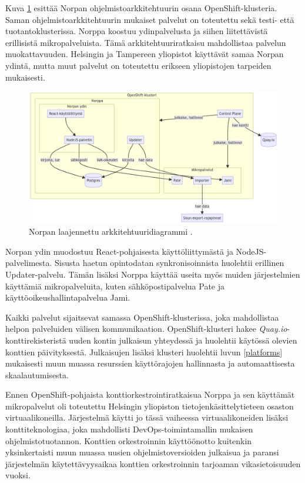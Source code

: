 Kuva \ref{fig:norppa:architecture} esittää Norpan ohjelmistoarkkitehtuurin osana OpenShift-klusteria.
Saman ohjelmistoarkkitehtuurin mukaiset palvelut on toteutettu sekä testi- että tuotantoklusterissa.
Norppa koostuu ydinpalvelusta ja siihen liitettävistä erillisistä mikropalveluista.
Tämä arkkitehtuuriratkaisu mahdollistaa palvelun muokattavuuden.
Helsingin ja Tampereen yliopistot käyttävät samaa Norpan ydintä, mutta muut palvelut on toteutettu erikseen yliopistojen tarpeiden mukaisesti.

\begin{figure}[ht]
\begin{center}
\includegraphics[width=1\textwidth]{figures/norppa_architecture.png}
\caption{Norpan laajennettu arkkitehtuuridiagrammi \cite{Norppa23}\label{fig:norppa:architecture}.}
\end{center}
\end{figure}

Norpan ydin muodostuu React-pohjaisesta käyttöliittymästä ja NodeJS-palvelimesta.
Sisusta haetun opintodatan synkronisoinnista huolehtii erillinen Updater-palvelu.
Tämän lisäksi Norppa käyttää useita myös muiden järjestelmien käyttämiä mikropalveluita, kuten sähköpostipalvelua Pate ja käyttöoikeushallintapalvelua Jami.

Kaikki palvelut sijaitsevat samassa OpenShift-klusterissa, joka mahdollistaa helpon palveluiden välisen kommunikaation.
OpenShift-klusteri hakee \textit{Quay.io}-konttirekisteristä uuden kontin julkaisun yhteydessä ja huolehtii käytössä olevien konttien päivityksestä.
Julkaisujen lisäksi klusteri huolehtii luvun \ref{platforms} mukaisesti muun muassa resurssien käyttörajojen hallinnasta ja automaattisesta skaalautumisesta.

Ennen OpenShift-pohjaista konttiorkestrointiratkaisua Norppa ja sen käyttämät mikropalvelut oli toteutettu Helsingin yliopiston tietojenkäsittelytieteen osaston virtuaalikoneilla.
Järjestelmä käytti jo tässä vaiheessa virtuaalikoneiden lisäksi konttiteknologiaa, joka mahdollisti DevOps-toimintamallin mukaisen ohjelmistotuotannon.
Konttien orkestroinnin käyttöönotto kuitenkin yksinkertaisti muun muassa uusien ohjelmistoversioiden julkaisua ja paransi järjestelmän käytettävyysaikaa konttien orkestroinnin tarjoaman vikasietoisuuden vuoksi.

